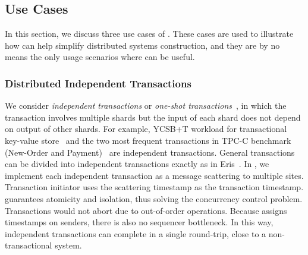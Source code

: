 \iffalse
\subsection{Use Cases}
\label{subsec:application-scenarios}

In this section, we discuss three use cases of \sys.
These cases are used to illustrate how \sys can help simplify distributed systems construction, and they are by no means the only usage scenarios where \sys can be useful.

\subsubsection{Distributed Independent Transactions}
\label{subsec:transactional-kvs}
We consider \emph{independent transactions} or \emph{one-shot transactions}~\cite{kallman2008h}, in which the transaction involves multiple shards but the input of each shard does not depend on output of other shards.
For example, YCSB+T workload for transactional key-value store~\cite{dey2014ycsbt} and the two most frequent transactions in TPC-C benchmark (New-Order and Payment)~\cite{tpcc} are independent transactions.
General transactions can be divided into independent transactions exactly as in Eris~\cite{eris}.
In \sys, we implement each independent transaction as a message scattering to multiple sites.
Transaction initiator uses the scattering timestamp as the transaction timestamp.
\sys guarantees atomicity and isolation, thus solving the concurrency control problem.
Transactions would not abort due to out-of-order operations.
Because \sys assigns timestamps on senders, there is also no sequencer bottleneck.
In this way, independent transactions can complete in a single round-trip, close to a non-transactional system.%


